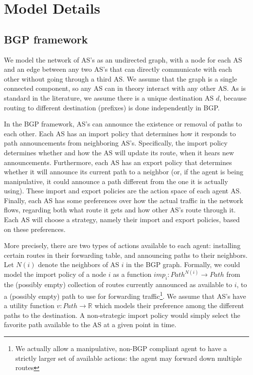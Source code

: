 \documentclass[pdftex,twoside,twocolumn,10pt,letterpaper]{article}
\newcommand{\R}{\mathbb{R}}
\begin{document}
\section{Model Details}
  \subsection{BGP framework}
    We model the network of AS's as an undirected graph, with a node for each AS
    and an edge between any two AS's that can directly communicate with each other
    without going through a third AS. We assume that the graph is a single
    connected component, so any AS can in theory interact with any other AS.
    As is standard in the literature, we assume there is a unique destination AS
    $d$, because routing to different destination (prefixes) is done
    independently in BGP.

    In the BGP framework, AS's can announce the
    existence or removal of paths to each other.
    Each AS has an import policy that
    determines how it responds to path announcements from neighboring AS's.
    Specifically, the import policy determines whether and how the AS will update
    its route, when it hears new announcements.
    Furthermore, each AS has an export policy that determines whether it will
    announce its current path to a neighbor (or, if the agent is being
    manipulative, it could announce a path different from the one it is actually
    using). These import and export policies are the action space of each agent AS.
    Finally, each AS has some preferences over how the actual traffic in the
    network flows, regarding both what route it gets and how other AS's route through it.
    Each AS will choose a strategy, namely their import and export
    policies, based on these preferences.

    More precisely, there are two types of actions available to each agent:
    installing certain routes in their forwarding table,
    and announcing paths to their neighbors.
    Let $N(i)$ denote the neighbors of AS $i$ in the BGP graph.
    Formally, we could model the import policy of a node $i$ as a function
    $imp_i : Path^{N(i)} \to Path$ from the (possibly empty) collection of
    routes currently announced as available to $i$, to a (possibly empty) path
    to use for forwarding traffic\footnote{
      We actually allow a manipulative, non-BGP compliant agent to have a
      strictly larger set of available actions: the agent may forward down
      multiple routes
    }. We assume that AS's have a utility function $v : Path \to \R$
    which models their preference among the different paths to the destination.
    A non-strategic import policy would simply select the favorite
    path available to the AS at a given point in time.
\end{document}
